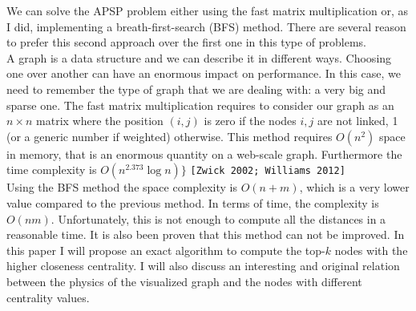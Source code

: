 \noindent We can solve the APSP problem either using the fast matrix multiplication or, as I did, implementing a breath-first-search (BFS) method. There are several reason to prefer this second approach over the first one in this type of problems. \\

\noindent A graph is a data structure and we can describe it in different ways. Choosing one over another can have an enormous impact on performance. In this case, we need to remember the type of graph that we are dealing with: a very big and sparse one. The fast matrix multiplication requires to consider our graph as an $n\times n$ matrix where the position $(i,j)$ is zero if the nodes $i,j$ are not linked, 1 (or a generic number if weighted) otherwise. This method requires $O(n^2)$ space in memory, that is an enormous quantity on a web-scale graph. Furthermore the time complexity is $O(n^{2.373} \log n)\}$ \texttt{[Zwick 2002; Williams 2012]}  \\

\noindent Using the BFS method the space complexity is $O(n+m)$, which is a very lower value compared to the previous method. In terms of time, the complexity is $O(nm)$. Unfortunately, this is not enough to compute all the distances in a reasonable time. It is also been proven that this method can not be improved. In this paper I will propose an exact algorithm to compute the top-$k$ nodes with the higher closeness centrality. I will also discuss an interesting and original relation between the physics of the visualized graph and the nodes with different centrality values.
